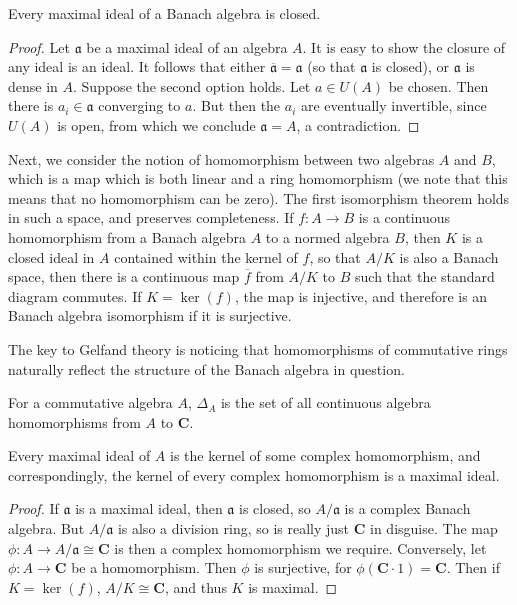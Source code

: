 \begin{lemma}
    Every maximal ideal of a Banach algebra is closed.
\end{lemma}
\begin{proof}
    Let $\mathfrak{a}$ be a maximal ideal of an algebra $A$. It is easy to show the closure of any ideal is an ideal. It follows that either $\overline{\mathfrak{a}} = \mathfrak{a}$ (so that $\mathfrak{a}$ is closed), or $\mathfrak{a}$ is dense in $A$. Suppose the second option holds. Let $a \in U(A)$ be chosen. Then there is $a_i \in \mathfrak{a}$ converging to $a$. But then the $a_i$ are eventually invertible, since $U(A)$ is open, from which we conclude $\mathfrak{a} = A$, a contradiction.
\end{proof}

Next, we consider the notion of homomorphism between two algebras $A$ and $B$, which is a map which is both linear and a ring homomorphism (we note that this means that no homomorphism can be zero). The first isomorphism theorem holds in such a space, and preserves completeness. If $f:A \to B$ is a continuous homomorphism from a Banach algebra $A$ to a normed algebra $B$, then $K$ is a closed ideal in $A$ contained within the kernel of $f$, so that $A/K$ is also a Banach space, then there is a continuous map $\overline{f}$ from $A/K$ to $B$ such that the standard diagram commutes. If $K = \ker(f)$, the map is injective, and therefore is an Banach algebra isomorphism if it is surjective.

The key to Gelfand theory is noticing that homomorphisms of commutative rings naturally reflect the structure of the Banach algebra in question.

\begin{definition}
    For a commutative algebra $A$, $\Delta_A$ is the set of all continuous algebra homomorphisms from $A$ to $\mathbf{C}$.
\end{definition}

\begin{lemma}
    Every maximal ideal of $A$ is the kernel of some complex homomorphism, and correspondingly, the kernel of every complex homomorphism is a maximal ideal.
\end{lemma}
\begin{proof}
    If $\mathfrak{a}$ is a maximal ideal, then $\mathfrak{a}$ is closed, so $A/\mathfrak{a}$ is a complex Banach algebra. But $A/\mathfrak{a}$ is also a division ring, so is really just $\mathbf{C}$ in disguise. The map $\phi: A \to A/\mathfrak{a} \cong \mathbf{C}$ is then a complex homomorphism we require. Conversely, let $\phi: A \to \mathbf{C}$ be a homomorphism. Then $\phi$ is surjective, for $\phi(\mathbf{C} \cdot 1) = \mathbf{C}$. Then if $K = \ker(f)$, $A/K \cong \mathbf{C}$, and thus $K$ is maximal.
\end{proof}

